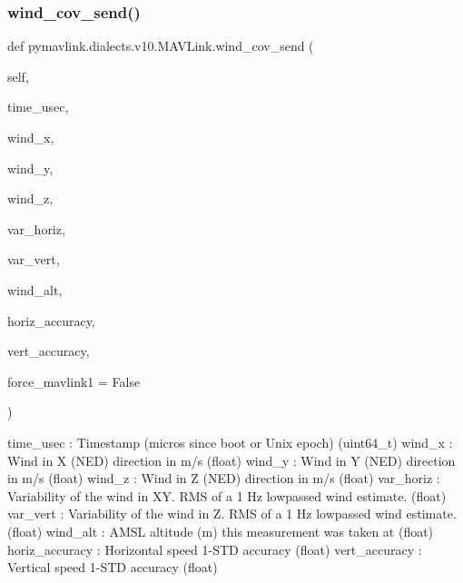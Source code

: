 \begin{DoxyVerb}
\begin{DoxyVerb}
\begin{DoxyVerb}
\begin{DoxyVerb}
\begin{DoxyVerb}
\begin{DoxyVerb}
\begin{DoxyVerb}
\begin{DoxyVerb}
\begin{DoxyVerb}
\begin{DoxyVerb}
\subsubsection{\texorpdfstring{wind\+\_\+cov\+\_\+send()}{wind\_cov\_send()}}
{\footnotesize\ttfamily def pymavlink.\+dialects.\+v10.\+M\+A\+V\+Link.\+wind\+\_\+cov\+\_\+send (\begin{DoxyParamCaption}\item[{}]{self,  }\item[{}]{time\+\_\+usec,  }\item[{}]{wind\+\_\+x,  }\item[{}]{wind\+\_\+y,  }\item[{}]{wind\+\_\+z,  }\item[{}]{var\+\_\+horiz,  }\item[{}]{var\+\_\+vert,  }\item[{}]{wind\+\_\+alt,  }\item[{}]{horiz\+\_\+accuracy,  }\item[{}]{vert\+\_\+accuracy,  }\item[{}]{force\+\_\+mavlink1 = {\ttfamily False} }\end{DoxyParamCaption})}

\begin{DoxyVerb}time_usec                 : Timestamp (micros since boot or Unix epoch) (uint64_t)
wind_x                    : Wind in X (NED) direction in m/s (float)
wind_y                    : Wind in Y (NED) direction in m/s (float)
wind_z                    : Wind in Z (NED) direction in m/s (float)
var_horiz                 : Variability of the wind in XY. RMS of a 1 Hz lowpassed wind estimate. (float)
var_vert                  : Variability of the wind in Z. RMS of a 1 Hz lowpassed wind estimate. (float)
wind_alt                  : AMSL altitude (m) this measurement was taken at (float)
horiz_accuracy            : Horizontal speed 1-STD accuracy (float)
vert_accuracy             : Vertical speed 1-STD accuracy (float)\end{DoxyVerb}
 \mbox{\label{classpymavlink_1_1dialects_1_1v10_1_1MAVLink_a6f6a53c64878e69cc2ca4f430e6e97f4}} 

\end{DoxyVerb}
\end{DoxyVerb}
\end{DoxyVerb}
\end{DoxyVerb}
\end{DoxyVerb}
\end{DoxyVerb}
\end{DoxyVerb}
\end{DoxyVerb}
\end{DoxyVerb}
\end{DoxyVerb}
